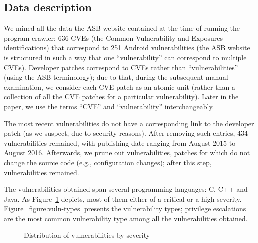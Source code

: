 \subsection{Data description}

We mined all the data the ASB website contained at the time of running the program-crawler: 636 CVEs (the Common Vulnerability and Exposures identifications) that correspond to 251 Android vulnerabilities (the ASB website is structured in such a way that one ``vulnerability'' can correspond to multiple CVEs). Developer patches correspond to CVEs rather than ``vulnerabilities'' (using the ASB terminology); due to that, during the subsequent manual examination, we consider each CVE patch as an atomic unit (rather than a collection of all the CVE patches for a particular vulnerability). Later in the paper, we use the terms ``CVE'' and ``vulnerability'' interchangeably. %

The most recent vulnerabilities do not have a corresponding link to the developer patch (as we suspect, due to security reasons). After removing such entries, 434 vulnerabilities remained, with publishing date ranging from August 2015 to August 2016. Afterwards, we prune out vulnerabilities, patches for which do not change the source code (e.g., configuration changes); after this step, \numvuln vulnerabilities remained.

The vulnerabilities obtained span several programming languages: C, C++ and Java. As Figure~\ref{figure:severity} depicts, most of them either of a critical or a high severity. Figure~\ref{figure:vuln-types} presents the vulnerability types; privilege escalations are the most common vulnerability type among all the vulnerabilities obtained.

\begin{figure}
    \small \caption{Distribution of vulnerabilities by severity}
        \label{figure:severity}
\end{figure}

